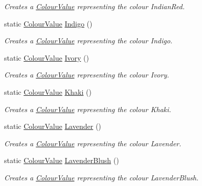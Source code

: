 \begin{DoxyCompactItemize}
\begin{DoxyCompactList}\small\item\em Creates a \hyperlink{classMezzanine_1_1ColourValue}{ColourValue} representing the colour IndianRed. \item\end{DoxyCompactList}\item 
static \hyperlink{classMezzanine_1_1ColourValue}{ColourValue} \hyperlink{classMezzanine_1_1ColourValue_a7158f59072971cc6a89ae875c006cb70}{Indigo} ()
\begin{DoxyCompactList}\small\item\em Creates a \hyperlink{classMezzanine_1_1ColourValue}{ColourValue} representing the colour Indigo. \item\end{DoxyCompactList}\item 
static \hyperlink{classMezzanine_1_1ColourValue}{ColourValue} \hyperlink{classMezzanine_1_1ColourValue_aba46470dfdbcf2dba4645f9885eaf4fb}{Ivory} ()
\begin{DoxyCompactList}\small\item\em Creates a \hyperlink{classMezzanine_1_1ColourValue}{ColourValue} representing the colour Ivory. \item\end{DoxyCompactList}\item 
static \hyperlink{classMezzanine_1_1ColourValue}{ColourValue} \hyperlink{classMezzanine_1_1ColourValue_a17739a67d74c93785cb990757f581ae2}{Khaki} ()
\begin{DoxyCompactList}\small\item\em Creates a \hyperlink{classMezzanine_1_1ColourValue}{ColourValue} representing the colour Khaki. \item\end{DoxyCompactList}\item 
static \hyperlink{classMezzanine_1_1ColourValue}{ColourValue} \hyperlink{classMezzanine_1_1ColourValue_a1c25e35682e1936084ac695f3586b1c5}{Lavender} ()
\begin{DoxyCompactList}\small\item\em Creates a \hyperlink{classMezzanine_1_1ColourValue}{ColourValue} representing the colour Lavender. \item\end{DoxyCompactList}\item 
static \hyperlink{classMezzanine_1_1ColourValue}{ColourValue} \hyperlink{classMezzanine_1_1ColourValue_ab967fe28fc492b9556ab01e7508b73e1}{LavenderBlush} ()
\begin{DoxyCompactList}\small\item\em Creates a \hyperlink{classMezzanine_1_1ColourValue}{ColourValue} representing the colour LavenderBlush. \item\end{DoxyCompactList}\item 

\end{DoxyCompactItemize}
